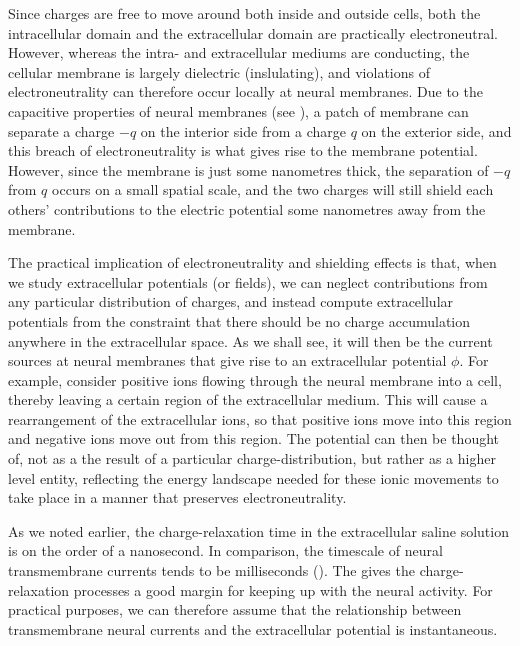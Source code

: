 Since charges are free to move around both inside and outside cells, both the intracellular domain and the extracellular domain are practically electroneutral. However, whereas the intra- and extracellular mediums are conducting, the cellular membrane is largely dielectric (inslulating), and violations of electroneutrality can therefore occur locally at neural membranes.
Due to the capacitive properties of neural membranes (see ), a patch of membrane can separate a charge $-q$ on the interior side from a charge $q$ on the exterior side, and this breach of electroneutrality is what gives rise to the membrane potential. However, since the membrane is just some nanometres thick, the separation of $-q$ from $q$ occurs on a small spatial scale, and the two charges will still shield each others' contributions to the electric potential some nanometres away from the membrane. 

The practical implication of electroneutrality and shielding effects is that, when we study extracellular potentials (or fields), we can neglect contributions from any particular distribution of charges, and instead compute extracellular potentials from the constraint that there should be no charge accumulation anywhere in the extracellular space. As we shall see, it will then be the current sources at neural membranes that give rise to an extracellular potential $\phi$. For example, consider positive ions flowing through the neural membrane into a cell, thereby leaving a certain region of the extracellular medium. This will cause a rearrangement of the extracellular ions, so that positive ions move into this region and negative ions move out from this region. The potential can then be thought of, not as a the result of a particular charge-distribution, but rather as a higher level entity, reflecting the energy landscape needed for these ionic movements to take place in a manner that preserves electroneutrality. 

As we noted earlier, the charge-relaxation time in the extracellular saline solution is on the order of a nanosecond. In comparison, the timescale of neural transmembrane currents tends to be milliseconds (). The gives the charge-relaxation processes a good margin for keeping up with the neural activity. For practical purposes, we can therefore assume that the relationship between transmembrane neural currents and the extracellular potential is instantaneous.

